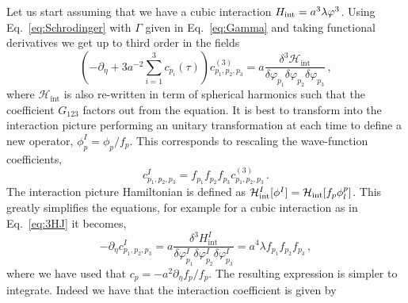 \documentclass[a4paper,11pt]{article}
\numberwithin{equation}{section}
\numberwithin{equation}{section}
\begin{document}
Let us start assuming that we have a cubic interaction $H_{\rm{int}}=a^3 \lambda \varphi^3$. Using Eq.~\eqref{eq:Schrodinger} with $\Gamma$ given in Eq.~\eqref{eq:Gamma} and taking  functional derivatives we get up to third order in the fields~\cite{Cespedes:2020xqq}
\begin{equation}
\left(-\partial_\eta+3 a^{-2}\sum_{i=1}^3c_{p_i}(\tau) \right)c^{(3)}_{p_1,p_2,p_3}=a \frac{\delta^3 \mathcal{H}_\mathrm{int}}{\delta\varphi_{p_1}\delta\varphi_{p_2}\delta\varphi_{p_3}} \,,\label{eq:3HJ}
\end{equation}
where $\mathcal{H}_\mathrm{int}$ is also re-written in term of spherical harmonics such that the coefficient $G_{123}$ factors out from the equation.
It is best to transform into the interaction picture performing an unitary transformation at each time to define a new operator, $\phi_p^I=\phi_p/f_p$. This corresponds to rescaling  the wave-function coefficients,
\begin{equation}
\label{eq:InteractionPictureCoefficients}
c^I_{p_1,p_2,p_3}=f_{p_1}f_{p_2}f_{p_3}c^{(3)}_{p_1,p_2,p_3} \,.
\end{equation}
The interaction picture Hamiltonian is defined as $\mathcal{H}^{I}_{\rm{int}}[\phi^I]=\mathcal{H}_{\rm{int}}[f_p\phi_l^p]$. This greatly simplifies the equations, for example for a cubic interaction as in Eq.~\eqref{eq:3HJ} it becomes,
\begin{equation}
-\partial_\eta c^I_{p_1,p_2,p_3}=a\frac{\delta^3H_\mathrm{int}^I}{\delta\varphi_{p_1}^I\delta\varphi_{p_2}^I\delta\varphi_{p_3}^I}=a^4 \lambda  f_{p_1}f_{p_2}f_{p_3} \,,
\label{eq:cubicHJ}
\end{equation}
where we have used that $c_p=-a^2\partial_\eta f_p/f_p$. The resulting expression is simpler to integrate. Indeed we have that the interaction coefficient is given by
\end{document}
